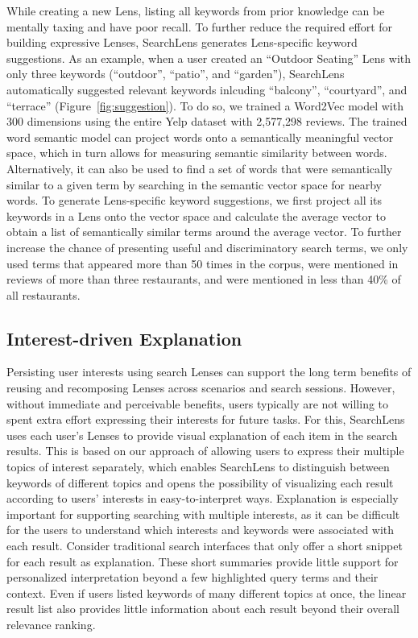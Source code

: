 \documentclass{sigchi}
\begin{document}
While creating a new Lens, listing all keywords from prior knowledge can be mentally taxing and have poor recall. To further reduce the required effort for building expressive Lenses, SearchLens generates Lens-specific keyword suggestions. As an example, when a user created an ``Outdoor Seating'' Lens with only three keywords (``outdoor'', ``patio'', and ``garden''), SearchLens automatically suggested relevant keywords inlcuding ``balcony'', ``courtyard'', and ``terrace'' (Figure~\ref{fig:suggestion}). To do so, we trained a Word2Vec model \cite{mikolov2013efficient} with 300 dimensions using the entire Yelp dataset with 2,577,298 reviews. The trained word semantic model can project words onto a semantically meaningful vector space, which in turn allows for measuring semantic similarity between words. Alternatively, it can also be used to find a set of words that were semantically similar to a given term by searching in the semantic vector space for nearby words. To generate Lens-specific keyword suggestions, we first project all its keywords in a Lens onto the vector space and calculate the average vector to obtain a list of semantically similar terms around the average vector. To further increase the chance of presenting useful and discriminatory search terms, we only used terms that appeared more than 50 times in the corpus, were mentioned in reviews of more than three restaurants, and were mentioned in less than 40\% of all restaurants.


\subsection{Interest-driven Explanation}

Persisting user interests using search Lenses can support the long term benefits of reusing and recomposing Lenses across scenarios and search sessions. However, without immediate and perceivable benefits, users typically are not willing to spent extra effort expressing their interests for future tasks. For this, SearchLens uses each user's Lenses to provide visual explanation of each item in the search results. This is based on our approach of allowing users to express their multiple topics of interest separately, which enables SearchLens to distinguish between keywords of different topics and opens the possibility of visualizing each result according to users' interests in easy-to-interpret ways. Explanation is especially important for supporting searching with multiple interests, as it can be difficult for the users to understand which interests and keywords were associated with each result. Consider traditional search interfaces that only offer a short snippet for each result as explanation. These short summaries provide little support for personalized interpretation beyond a few highlighted query terms and their context. Even if users listed keywords of many different topics at once, the linear result list also provides little information about each result beyond their overall relevance ranking.
\end{document}
